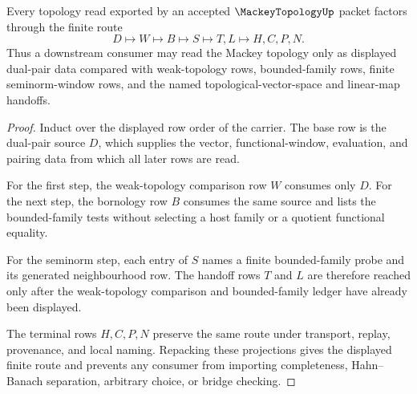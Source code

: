 \begin{theorem}
\label{thm:mackey-topology-dual-pair-finite-route}
Every topology read exported by an accepted $\MackeyTopologyUp$ packet factors through the finite route
$$
D \longmapsto W \longmapsto B \longmapsto S \longmapsto T,L \longmapsto H,C,P,N .
$$
Thus a downstream consumer may read the Mackey topology only as displayed dual-pair data compared with weak-topology rows, bounded-family rows, finite seminorm-window rows, and the named topological-vector-space and linear-map handoffs.
\end{theorem}
\begin{proof}
Induct over the displayed row order of the carrier. The base row is the dual-pair source $D$, which supplies the vector, functional-window, evaluation, and pairing data from which all later rows are read.

For the first step, the weak-topology comparison row $W$ consumes only $D$. For the next step, the bornology row $B$ consumes the same source and lists the bounded-family tests without selecting a host family or a quotient functional equality.

For the seminorm step, each entry of $S$ names a finite bounded-family probe and its generated neighbourhood row. The handoff rows $T$ and $L$ are therefore reached only after the weak-topology comparison and bounded-family ledger have already been displayed.

The terminal rows $H,C,P,N$ preserve the same route under transport, replay, provenance, and local naming. Repacking these projections gives the displayed finite route and prevents any consumer from importing completeness, Hahn--Banach separation, arbitrary choice, or bridge checking.
\end{proof}


